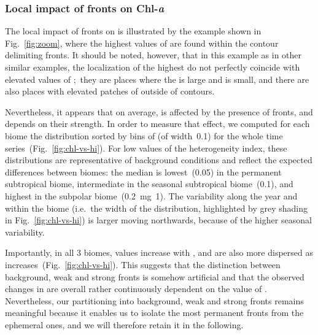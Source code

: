 \subsubsection{Local impact of fronts on Chl-\emph{a}}

The local impact of fronts on  is illustrated by the example shown in Fig.~\ref{fig:zoom}, where the highest values of  are found within the  contour delimiting fronts.
It should be noted, however, that in this example as in other similar examples, the localization of the highest  do not perfectly coincide with elevated values of ;\ they are places where the  is large and  is small, and there are also places with elevated patches of  outside of  contours.

Nevertheless, it appears that on average,  is affected by the presence of fronts, and depends on their strength.
In order to measure that effect, we computed for each biome the  distribution sorted by bins of  (of width~\num{0.1}) for the whole time series~(Fig.~\ref{fig:chl-vs-hi}).
For low values of the heterogeneity index, these distributions are representative of background conditions and reflect the expected differences between biomes: the median  is lowest~(\qty{0.05}{\mgm}) in the permanent subtropical biome, intermediate in the seasonal subtropical biome~(\qty{0.1}{\mgm}), and highest in the subpolar biome~(\qty{0.2}{\mg1}).
The  variability along the year and within the biome (i.e.\ the width of the distribution, highlighted by grey shading in Fig.~\ref{fig:chl-vs-hi}) is larger moving northwards, because of the higher seasonal variability.

Importantly, in all 3 biomes,  values increase with , and are also more dispersed as  increases~(Fig.~\ref{fig:chl-vs-hi}).
This suggests that the distinction between background, weak and strong fronts is somehow artificial and that the observed changes in  are overall rather continuously dependent on the value of .
Nevertheless, our partitioning into background, weak and strong fronts remains meaningful because it enables us to isolate the most permanent fronts from the ephemeral ones, and we will therefore retain it in the following.


